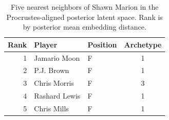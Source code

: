 \begin{table}[htbp]
  \centering\small
  \begin{tabular}{rllc}
    \toprule
    Rank & Player & Position & Archetype \\
    \midrule
    1 & Jamario Moon & F & 1 \\
    2 & P.J. Brown & F & 1 \\
    3 & Chris Morris & F & 3 \\
    4 & Rashard Lewis & F & 1 \\
    5 & Chris Mills & F & 1 \\
    \bottomrule
  \end{tabular}
  \caption{Five nearest neighbors of Shawn Marion in the Procrustes-aligned posterior latent space. Rank is by posterior mean embedding distance.}
  \label{tab:Shawn_Marion_neighbors}
\end{table}

